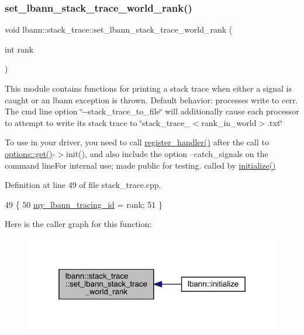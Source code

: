 \subsubsection{\texorpdfstring{set\+\_\+lbann\+\_\+stack\+\_\+trace\+\_\+world\+\_\+rank()}{set\_lbann\_stack\_trace\_world\_rank()}}
{\footnotesize\ttfamily void lbann\+::stack\+\_\+trace\+::set\+\_\+lbann\+\_\+stack\+\_\+trace\+\_\+world\+\_\+rank (\begin{DoxyParamCaption}\item[{int}]{rank }\end{DoxyParamCaption})}

This module contains functions for printing a stack trace when either a signal is caught or an lbann exception is thrown. Default behavior\+: processes write to cerr. The cmd line option \char`\"{}-\/-\/stack\+\_\+trace\+\_\+to\+\_\+file\char`\"{} will additionally cause each processor to attempt to write its stack trace to \char`\"{}stack\+\_\+trace\+\_\+$<$rank\+\_\+in\+\_\+world$>$.\+txt\char`\"{}

To use in your driver, you need to call \hyperlink{namespacelbann_1_1stack__trace_a12c3aa60ec15015b925249fc61352f07}{register\+\_\+handler()} after the call to \hyperlink{classoptions_a9ecfe9c365269df68a41b961c31ae3f5}{options\+::get()}-\/$>$init(), and also include the option --catch\+\_\+signals on the command line\+For internal use; made public for testing. called by \hyperlink{namespacelbann_a3d91b615e42bf5744deeed770879bc8c}{initialize()} 

Definition at line 49 of file stack\+\_\+trace.\+cpp.


\begin{DoxyCode}
49                                                 \{
50   \hyperlink{namespacelbann_1_1stack__trace_a78efe186260936105751e65f56c381d7}{my\_lbann\_tracing\_id} = rank;
51 \}
\end{DoxyCode}
Here is the caller graph for this function\+:\nopagebreak
\begin{figure}[H]
\begin{center}
\leavevmode
\includegraphics[width=319pt]{namespacelbann_1_1stack__trace_a1063a9a501d78a7525224461e155a483_icgraph}
\end{center}
\end{figure}
\mbox{\label{namespacelbann_1_1stack__trace_a22d63f8c305ad282df5af296d61639e6}} 
